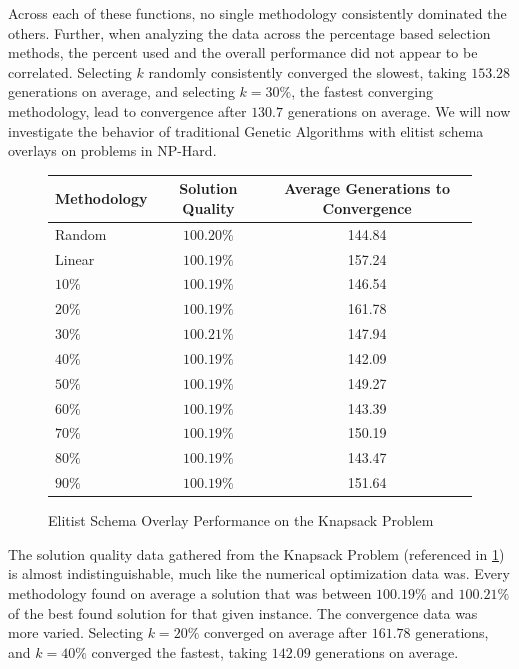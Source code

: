 Across each of these functions, no single methodology consistently dominated the others. Further, when analyzing the data across the percentage based selection methods, the percent used and the overall performance did not appear to be correlated. Selecting $k$ randomly consistently converged the slowest, taking $153.28$ generations on average, and selecting $k = 30\%$, the fastest converging methodology, lead to convergence after $130.7$ generations on average. We will now investigate the behavior of traditional Genetic Algorithms with elitist schema overlays on problems in NP-Hard.

\begin{figure}[hbtp!]
\begin{center}
\begin{tabular}{ | l | c | c | }
\hline
Methodology & Solution Quality & Average Generations to Convergence \\
\hline
Random & $100.20\%$ & 144.84 \\
\hline
Linear & $100.19\%$ & 157.24 \\
\hline
$10\%$ & $100.19\%$ & 146.54 \\
\hline
$20\%$ & $100.19\%$ & 161.78 \\
\hline
$30\%$ & $100.21\%$ & 147.94 \\
\hline
$40\%$ & $100.19\%$ & 142.09 \\
\hline
$50\%$ & $100.19\%$ & 149.27 \\
\hline
$60\%$ & $100.19\%$ & 143.39 \\
\hline
$70\%$ & $100.19\%$ & 150.19 \\
\hline
$80\%$ & $100.19\%$ & 143.47 \\
\hline
$90\%$ & $100.19\%$ & 151.64 \\
\hline
\end{tabular}
\caption{Elitist Schema Overlay Performance on the Knapsack Problem}
\label{fig:eso_knapsack}
\end{center}
\end{figure}

The solution quality data gathered from the Knapsack Problem (referenced in \ref{fig:eso_knapsack}) is almost indistinguishable, much like the numerical optimization data was. Every methodology found on average a solution that was between $100.19\%$ and $100.21\%$ of the best found solution for that given instance. The convergence data was more varied. Selecting $k = 20\%$ converged on average after $161.78$ generations, and $k = 40\%$ converged the fastest, taking $142.09$ generations on average. 

